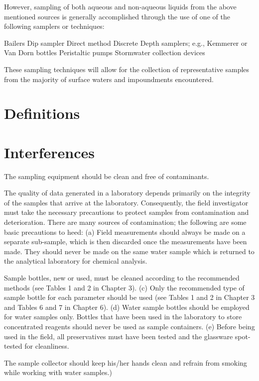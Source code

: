 \documentclass[12pt]{../SOP4_alpha}\usepackage[]{graphicx}\usepackage[]{xcolor}
\begin{document}
\NP However, sampling of both aqueous and non-aqueous liquids from the above mentioned sources is generally accomplished through the use of one of the following samplers or techniques:


\NP Bailers
\NP Dip sampler
\NP Direct method
\NP Discrete Depth samplers; e.g., Kemmerer or Van Dorn bottles
\NP Peristaltic pumps
\NP Stormwater collection devices


\NP These sampling techniques will allow for the collection of representative samples from the majority of surface waters and impoundments encountered.

\section{Definitions}



\section{Interferences}

\NP The sampling equipment should be clean and free of contaminants.

\NP The quality of data generated in a laboratory depends primarily on the integrity of the samples that arrive at the laboratory. Consequently, the field investigator must take the necessary precautions to protect samples from contamination and deterioration. There are many sources of contamination; the following are some basic precautions to heed: (a) Field measurements should always be made on a separate sub-sample, which is then discarded once the measurements have been made. They should never be made on the same water sample which is returned to the analytical laboratory for chemical analysis.

\NP Sample bottles, new or used, must be cleaned according to the recommended methods (see Tables 1 and 2 in Chapter 3). (c) Only the recommended type of sample bottle for each parameter should be used (see Tables 1 and 2 in Chapter 3 and Tables 6 and 7 in Chapter 6). (d) Water sample bottles should be employed for water samples only. Bottles that have been used in the laboratory to store concentrated reagents should never be used as sample containers. (e) Before being used in the field, all preservatives must have been tested and the glassware spot-tested for cleanliness. 

\NP The sample collector should keep his/her hands clean and refrain from smoking while working with water samples.)
\end{document}
